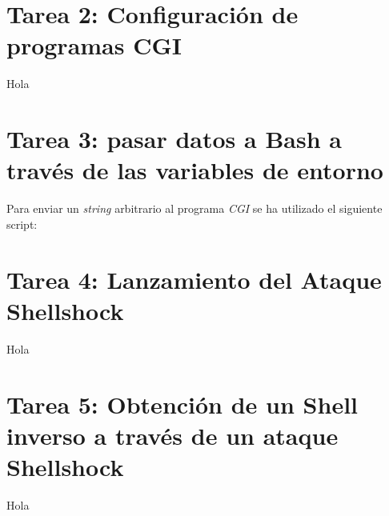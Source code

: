 \documentclass[10pt,a4paper]{article}
\begin{document}
\section{Tarea 2: Configuración de programas CGI}

Hola

\section{Tarea 3: pasar datos a Bash a través de las variables de entorno}

Para enviar un \emph{string} arbitrario al programa \emph{CGI} se ha utilizado el siguiente script:\\




\section{Tarea 4: Lanzamiento del Ataque Shellshock}

Hola

\section{Tarea 5: Obtención de un Shell inverso a través de un ataque Shellshock}

Hola
\end{document}
